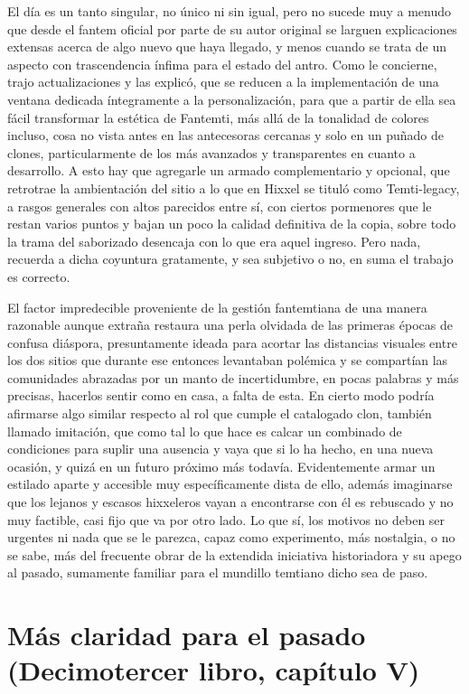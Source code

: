 \documentclass[
]{book}
\begin{document}
El día es un tanto singular, no único ni sin igual, pero no sucede muy a menudo que desde el fantem oficial por parte de su autor original se larguen explicaciones extensas acerca de algo nuevo que haya llegado, y menos cuando se trata de un aspecto con trascendencia ínfima para el estado del antro. Como le concierne, trajo actualizaciones y las explicó, que se reducen a la implementación de una ventana dedicada íntegramente a la personalización, para que a partir de ella sea fácil transformar la estética de Fantemti, más allá de la tonalidad de colores incluso, cosa no vista antes en las antecesoras cercanas y solo en un puñado de clones, particularmente de los más avanzados y transparentes en cuanto a desarrollo. A esto hay que agregarle un armado complementario y opcional, que retrotrae la ambientación del sitio a lo que en Hixxel se tituló como Temti-legacy, a rasgos generales con altos parecidos entre sí, con ciertos pormenores que le restan varios puntos y bajan un poco la calidad definitiva de la copia, sobre todo la trama del saborizado desencaja con lo que era aquel ingreso. Pero nada, recuerda a dicha coyuntura gratamente, y sea subjetivo o no, en suma el trabajo es correcto.

El factor impredecible proveniente de la gestión fantemtiana de una manera razonable aunque extraña restaura una perla olvidada de las primeras épocas de confusa diáspora, presuntamente ideada para acortar las distancias visuales entre los dos sitios que durante ese entonces levantaban polémica y se compartían las comunidades abrazadas por un manto de incertidumbre, en pocas palabras y más precisas, hacerlos sentir como en casa, a falta de esta. En cierto modo podría afirmarse algo similar respecto al rol que cumple el catalogado clon, también llamado imitación, que como tal lo que hace es calcar un combinado de condiciones para suplir una ausencia y vaya que si lo ha hecho, en una nueva ocasión, y quizá en un futuro próximo más todavía. Evidentemente armar un estilado aparte y accesible muy específicamente dista de ello, además imaginarse que los lejanos y escasos hixxeleros vayan a encontrarse con él es rebuscado y no muy factible, casi fijo que va por otro lado. Lo que sí, los motivos no deben ser urgentes ni nada que se le parezca, capaz como experimento, más nostalgia, o no se sabe, más del frecuente obrar de la extendida iniciativa historiadora y su apego al pasado, sumamente familiar para el mundillo temtiano dicho sea de paso.

\hypertarget{muxe1s-claridad-para-el-pasado-decimotercer-libro-capuxedtulo-v}{%
\section{Más claridad para el pasado (Decimotercer libro, capítulo V)}\label{muxe1s-claridad-para-el-pasado-decimotercer-libro-capuxedtulo-v}}
\end{document}

